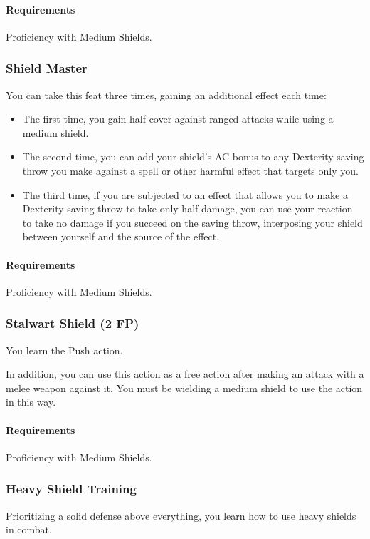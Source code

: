     \paragraph{Requirements} Proficiency with Medium Shields.
\subsubsection{Shield Master} \label{feat::shieldmaster}
    You can take this feat three times, gaining an additional effect each time:
    \begin{itemize}
        \item The first time, you gain half cover against ranged attacks while using a medium shield.
        \item The second time, you can add your shield's AC bonus to any Dexterity saving throw you make against a spell or other harmful effect that targets only you.
        \item The third time, if you are subjected to an effect that allows you to make a Dexterity saving throw to take only half damage, you can use your reaction to take no damage if you succeed on the saving throw, interposing your shield between yourself and the source of the effect.
    \end{itemize}
    \paragraph{Requirements} Proficiency with Medium Shields.
\subsubsection{Stalwart Shield (2 FP)} \label{feat::stalwartshield}
    You learn the Push action.

    In addition, you can use this action as a free action after making an attack with a melee weapon against it.
    You must be wielding a medium shield to use the action in this way.
    \paragraph{Requirements} Proficiency with Medium Shields.
\subsubsection{Heavy Shield Training} \label{feat::heavyshieldtraining}
    Prioritizing a solid defense above everything, you learn how to use heavy shields in combat.
